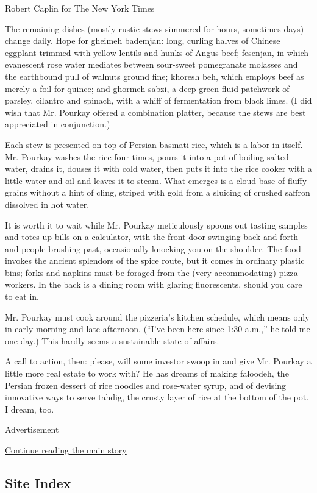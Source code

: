 Robert Caplin for The New York Times

The remaining dishes (mostly rustic stews simmered for hours, sometimes
days) change daily. Hope for gheimeh bademjan: long, curling halves of
Chinese eggplant trimmed with yellow lentils and hunks of Angus beef;
fesenjan, in which evanescent rose water mediates between sour-sweet
pomegranate molasses and the earthbound pull of walnuts ground fine;
khoresh beh, which employs beef as merely a foil for quince; and ghormeh
sabzi, a deep green fluid patchwork of parsley, cilantro and spinach,
with a whiff of fermentation from black limes. (I did wish that Mr.
Pourkay offered a combination platter, because the stews are best
appreciated in conjunction.)

Each stew is presented on top of Persian basmati rice, which is a labor
in itself. Mr. Pourkay washes the rice four times, pours it into a pot
of boiling salted water, drains it, douses it with cold water, then puts
it into the rice cooker with a little water and oil and leaves it to
steam. What emerges is a cloud base of fluffy grains without a hint of
cling, striped with gold from a sluicing of crushed saffron dissolved in
hot water.

It is worth it to wait while Mr. Pourkay meticulously spoons out tasting
samples and totes up bills on a calculator, with the front door swinging
back and forth and people brushing past, occasionally knocking you on
the shoulder. The food invokes the ancient splendors of the spice route,
but it comes in ordinary plastic bins; forks and napkins must be foraged
from the (very accommodating) pizza workers. In the back is a dining
room with glaring fluorescents, should you care to eat in.

Mr. Pourkay must cook around the pizzeria's kitchen schedule, which
means only in early morning and late afternoon. (``I've been here since
1:30 a.m.,'' he told me one day.) This hardly seems a sustainable state
of affairs.

A call to action, then: please, will some investor swoop in and give Mr.
Pourkay a little more real estate to work with? He has dreams of making
faloodeh, the Persian frozen dessert of rice noodles and rose-water
syrup, and of devising innovative ways to serve tahdig, the crusty layer
of rice at the bottom of the pot. I dream, too.

Advertisement

\protect\hyperlink{after-bottom}{Continue reading the main story}

\hypertarget{site-index}{%
\subsection{Site Index}\label{site-index}}

